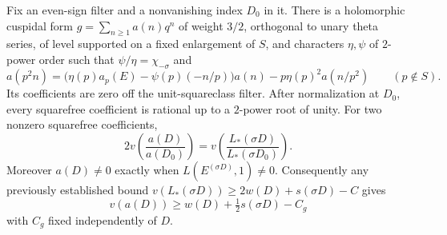 \begin{proposition}\label{co:even}
Fix an even-sign filter and a nonvanishing index $D_0$ in it.
There is a holomorphic cuspidal form $g=\sum_{n\geq1}a(n)q^n$ of weight
$3/2$, orthogonal to unary theta series, of level supported on a fixed
enlargement of $S$, and characters $\eta,\psi$ of $2$-power order such that
$\psi/\eta=\chi_{-\sigma}$ and
\begin{equation}\label{co:recurrence}
 a(p^2n)=\bigl(\eta(p)a_p(E)-\psi(p)(-n/p)\bigr)a(n)
              -p\eta(p)^2a(n/p^2)\qquad(p\notin S).
\end{equation}
Its coefficients are zero off the unit-squareclass filter.  After
normalization at $D_0$, every squarefree coefficient is rational up to a
$2$-power root of unity.  For two nonzero squarefree coefficients,
\begin{equation}\label{co:exact-ratio}
 2v\!\left(\frac{a(D)}{a(D_0)}\right)
   =v\!\left(\frac{L_*(\sigma D)}{L_*(\sigma D_0)}\right).
\end{equation}
Moreover $a(D)\neq0$ exactly when $L(E^{(\sigma D)},1)\neq0$.
Consequently any previously established bound
$v(L_*(\sigma D))\geq2w(D)+s(\sigma D)-C$ gives
\begin{equation}\label{co:even-bound}
 v(a(D))\geq w(D)+\tfrac12s(\sigma D)-C_g
\end{equation}
with $C_g$ fixed independently of $D$.
\end{proposition}

